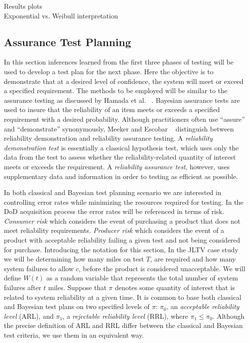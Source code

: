 \documentclass[12pt]{article}
\begin{document}
Results plots \\
Exponential vs. Weibull interpretation

\subsection{Assurance Test Planning}
In this section inferences learned from the first three phases of testing will
be used to develop a test plan for the next phase.  Here the objective is to
demonstrate that at a desired level of confidence, the system will meet or
exceed a specified requirement. The methods to be employed will be similar to
the assurance testing as discussed by Hamada et al. ~\cite{ref2}. Bayesian
assurance tests are used to insure that the reliability of an item meets or
exceeds a specified requirement with a desired probability. Although
practitioners often use ``assure'' and ``demonstrate'' synonymously, Meeker and
Escobar ~\cite{ME04} distinguish between reliability demonstration and
reliability assurance testing. A \emph{reliability demonstration test} is
essentially a classical hypothesis test, which uses only the data from the test
to assess whether the reliability-related quantity of interest meets or exceeds
the requirement. A \emph{reliability assurance test}, however, uses
supplementary data and information in order to testing as efficient as possible.

In both classical and Bayesian test planning scenario we are interested in
controlling error rates while minimizing the resources required for testing.  In
the DoD acquisition process the error rates will be referenced in terms of risk.
\emph{Consumer risk} which considers the event of purchasing a product that does
not meet reliability requirements.  \emph{Producer risk} which considers the
event of a product with acceptable reliability failing a given test and not
being considered for purchase.  Introducing the notation for this section, In
the JLTV case study we will be determining how many miles on test $T$, are
required and how many system failures to allow $c$, before the product is
considered unacceptable.  We will define $W(t)$ as a random variable that
represents the total number of system failures after $t$ miles.  Suppose that
$\pi$ denotes some quantity of interest that is related to system reliability at
a given time. It is common to base both classical and Bayesian test plans on two
specified levels of $\pi$: $\pi_0$, an \emph{acceptable reliability level}
(ARL), and $\pi_1$, a \emph{rejectable reliability level} (RRL), where $\pi_1
\leq  \pi_0$. Although the precise definition of ARL and RRL differ between the
classical and Bayesian test criteria, we use them in an equivalent way.
\end{document}
